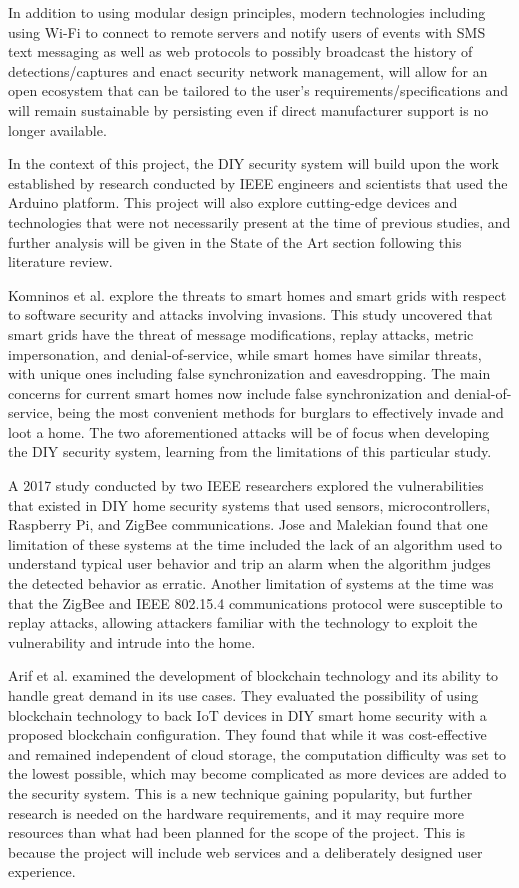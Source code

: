 \documentclass[conference]{IEEEtran}
\begin{document}
In addition to using modular design principles, modern technologies including using Wi-Fi
to connect to remote servers and notify users of events with SMS text messaging as well
as web protocols to possibly broadcast the history of detections/captures and enact
security network management, will allow for an open ecosystem that can be tailored
to the user’s requirements/specifications and will remain sustainable by persisting
even if direct manufacturer support is no longer available.

In the context of this project, the DIY security system will build upon the work
established by research conducted by IEEE engineers and scientists that used the
Arduino platform. This project will also explore cutting-edge devices and technologies
that were not necessarily present at the time of previous studies, and further analysis
will be given in the State of the Art section following this literature review.

Komninos et al. explore the threats to smart homes and smart grids
with respect to software security and attacks involving invasions. This study uncovered
that smart grids have the threat of message modifications, replay attacks, metric
impersonation, and denial-of-service, while smart homes have similar threats, with
unique ones including false synchronization and eavesdropping.\cite{komninosEtAl2014} The main concerns
for current smart homes now include false synchronization and denial-of-service, being
the most convenient methods for burglars to effectively invade and loot a home. The two
aforementioned attacks will be of focus when developing the DIY security system, learning
from the limitations of this particular study.

A 2017 study conducted by two IEEE researchers explored the vulnerabilities that
existed in DIY home security systems that used sensors, microcontrollers,
Raspberry Pi, and ZigBee communications.\cite{joseMalekian2017} Jose and Malekian found that one limitation
of these systems at the time included the lack of an algorithm used to understand typical
user behavior and trip an alarm when the algorithm judges the detected behavior as
erratic. Another limitation of systems at the time was that the ZigBee and
IEEE 802.15.4 communications protocol were susceptible to replay attacks, allowing
attackers familiar with the technology to exploit the vulnerability and intrude into the
home.\cite{joseMalekian2017}

Arif et al. examined the development of blockchain technology and its ability to
handle great demand in its use cases. They evaluated the possibility of using blockchain
technology to back IoT devices in DIY smart home security with a proposed blockchain
configuration. They found that while it was cost-effective and remained
independent of cloud storage, the computation difficulty was set to the lowest possible,
which may become complicated as more devices are added to the security system.\cite{arifEtAl_2020}
This is a new technique gaining popularity, but further research is needed on the hardware
requirements, and it may require more resources than what had been planned for the scope
of the project. This is because the project will include web services and a deliberately
designed user experience.
\end{document}
